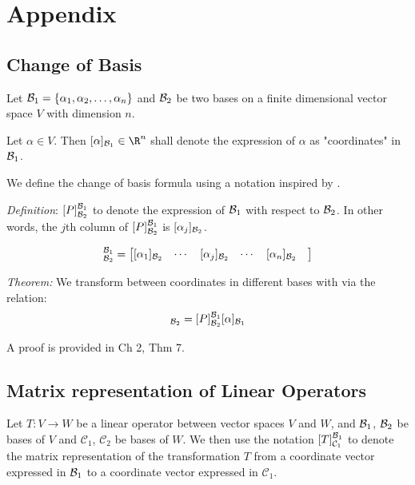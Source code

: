 \documentclass{homework}
\begin{document}
\section{Appendix} \label{appendix}
\subsection{Change of Basis}
Let $\mathcal{B}_1 = \{\alpha_1, \alpha_2, \dots, \alpha_n\}$ and $\mathcal{B}_2$
be two bases on a finite dimensional vector space $V$ with dimension $n$.

Let $\alpha \in V$. Then $[\alpha]_{\basis_1} \in \R^n$ shall
denote the expression of $\alpha$ as "coordinates" in $\mathcal{B}_1$.

We define the change of basis formula using a notation
inspired by \cite{bullo_lectures_2022}.


{\it Definition}: $[P]_{\mathcal{B}_2}^{\mathcal{B}_1}$ to denote the expression
of $\mathcal{B}_1$ with respect to $\mathcal{B}_2$. In other words, the $j$th column
of $[P]_{\mathcal{B}_2}^{\mathcal{B}_1}$ is $[\alpha_j]_{\mathcal{B}_2}$.


\begin{equation}
    [P]_{\basis_2}^{\basis_1} = \begin{bmatrix}
        [\alpha_1]_{\basis_2} & 
        \cdots &
        [\alpha_j]_{\basis_2} & 
        \cdots &
        [\alpha_n]_{\basis_2} & 
    \end{bmatrix}
\end{equation}

{\it Theorem:}
We transform between coordinates in different bases with via the relation:
\begin{equation}
    [\alpha]_{\basis_2} = [P]_{\basis_2}^{\basis_1} [\alpha]_{\basis_1}
\end{equation}

A proof is provided in \cite{hoffman_linear_2014} Ch 2, Thm 7.

\subsection{Matrix representation of Linear Operators}
Let $T: V \to W$ be a linear operator between vector spaces $V$ and $W$,
and $\mathcal{B}_1$, $\mathcal{B}_2$ be bases of $V$ and $\mathcal{C}_1$, $\mathcal{C}_2$
be bases of $W$.
We then use the notation $[T]_{\mathcal{C}_1}^{\mathcal{B}_1}$ to denote
the matrix representation of the transformation $T$ from a
coordinate vector expressed in $\mathcal{B}_1$ to a coordinate vector
expressed in $\mathcal{C}_1$.
\end{document}
